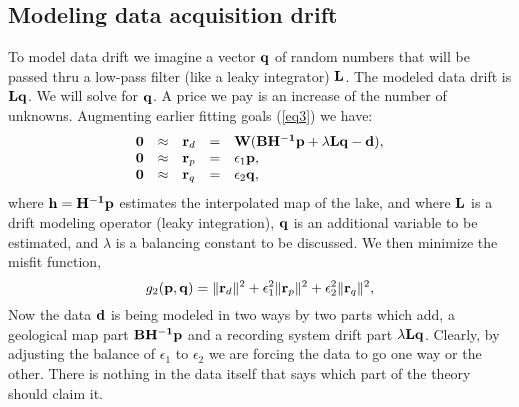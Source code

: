 \subsection{Modeling data acquisition drift}

To model data drift we imagine a vector $\bold q$ of random numbers
that will be passed thru a low-pass filter (like a leaky integrator) $\bold L$.
The modeled data drift is $\bold L\bold q$.
We will solve for $\bold q$.
A price we pay is an increase of the number of unknowns.
Augmenting earlier fitting goals
(\ref{eq3}) we have:
\begin{equation}
  \begin{array}{lllll}
    \bold 0 &\approx& \bold r_d &=& \bold W ( \bold B \bold {H^{-1}} \bold p + \lambda
    \bold L \bold q - \bold d
    ),\\
    \bold 0 &\approx& \bold r_p &=& \epsilon_1 \bold p ,\\
    \bold 0 &\approx& \bold r_q &=& \epsilon_2 \bold q,
  \end{array} \label{eq4}
\end{equation}
where ${\bf h}={\bf H^{-1}p}$ estimates the interpolated map of the lake, and
where ${\bf L}$ is a drift modeling operator (leaky integration),
${\bf q}$ is an additional variable to be estimated,
and $\lambda$ is a balancing constant to be discussed.
We then minimize the misfit function,
\begin{equation}
  g_2(\bold p,\bold q) = \|\bold r_d\|^2+\epsilon_1^2\|\bold r_p\|^2+\epsilon_2^2\|\bold r_q\|^2,
\end{equation}
Now the data $\bold d$ is being modeled in two ways
by two parts which add,
a geological map part $\bold B \bold {H^{-1}} \bold p$
and a recording system drift part $\lambda\bold L \bold q$.
Clearly, by adjusting the balance of
$\epsilon_1$ to
$\epsilon_2$ we are forcing the data to go one way or the other.
There is nothing in the data itself that says which part of
the theory should claim it.



